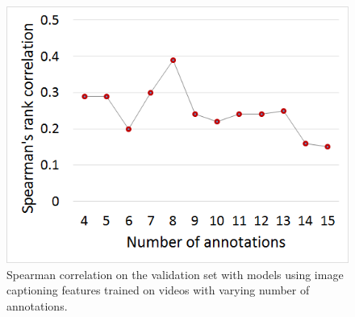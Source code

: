 \documentclass[sigconf]{acmart}
\begin{document}

\begin{figure}[h]	  
	\centering
	\includegraphics[width=0.7\columnwidth]{figures/annotations_modelling.png}
	\caption{Spearman correlation on the validation set with models using image captioning features trained on videos with varying number of annotations.}
	\label{num-ann}
\end{figure}
\end{document}
